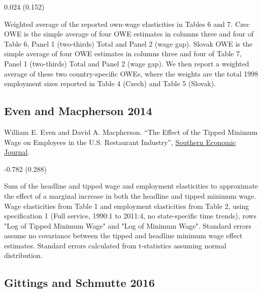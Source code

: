 \vspace{0.7em}

 0.024 (0.152)

\vspace{0.7em}

 Weighted average of the reported own-wage elasticities in Tables 6 and 7. Czec OWE is the simple average of four OWE estimates in columns three and four of Table 6, Panel 1 (two-thirds) Total and Panel 2 (wage gap). Slovak OWE is the simple average of four OWE estimates in columns three and four of Table 7, Panel 1 (two-thirds) Total and Panel 2 (wage gap). We then report a weighted average of these two country-specific OWEs, where the weights are the total 1998 employment sizes reported in Table 4 (Czech) and Table 5 (Slovak).

\subsection*{Even and Macpherson 2014}
\vspace{-0.7em}

\noindent William E. Even and David A. Macpherson. ``The Effect of the Tipped Minimum Wage on Employees in the U.S. Restaurant Industry'', \href{https://doi.org/10.4284/0038-4038-2012.283}{Southern Economic Journal}.

\vspace{0.7em}

 -0.782 (0.288)

\vspace{0.7em}

 Sum of the headline and tipped wage and employment elasticities to approximate the effect of a marginal increase in both the headline and tipped minimum wage. Wage elasticities from Table 1 and employment elasticities from Table 2, using specification 1 (Full service, 1990:1 to 2011:4, no state-specific time trends), rows "Log of Tipped Minimum Wage" and "Log of Minimum Wage". Standard errors assume no covariance between the tipped and headline minimum wage effect estimates. Standard errors calculated from t-statistics assuming normal distribution.

\subsection*{Gittings and Schmutte 2016}
\vspace{-0.7em}

